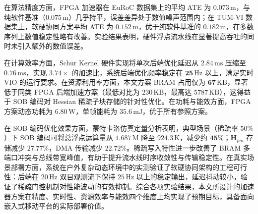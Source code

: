 在算法精度方面，FPGA 加速器在 EuRoC 数据集上的平均 ATE 为 $0.073\,\mathrm{m}$，与纯软件基准（$0.075\,\mathrm{m}$）几乎持平，误差差异处于数值噪声范围内；在 TUM-VI 数据集上，软硬协同方案平均 ATE 为 $0.152\,\mathrm{m}$，优于纯软件基准的 $0.182\,\mathrm{m}$，在多数序列上数值稳定性略有改善。实验结果表明，硬件浮点流水线在显著提高吞吐的同时未引入额外的数值误差。

在计算效率方面，Schur Kernel 硬件实现将单次后端优化延迟从 $2.84\,\mathrm{ms}$ 压缩至 $0.76\,\mathrm{ms}$，实现 $\mathbf{3.74\times}$ 的加速比，系统后端优化频率稳定在 $\mathbf{25\,\mathrm{Hz}}$ 以上，满足实时 VIO 的运行要求。在资源利用率方面，本文方案 BRAM 占用仅为 $\mathbf{67\,\mathrm{KB}}$，显著低于同类 FPGA 后端加速方案（最低对比为 $230\,\mathrm{KB}$，最高达 $5787\,\mathrm{KB}$），这得益于 SOB 编码对 Hessian 稀疏子块存储的针对性优化。在功耗与能效方面，FPGA 方案动态功耗为 $6.80\,\mathrm{W}$，单帧能耗为 $\mathbf{35.6\,\mathrm{mJ}}$，优于所有参照方案。

在 SOB 编码优化效果方面，蒙特卡洛仿真定量分析表明，典型场景（稀疏率 $50\%$）下 SOB 编码可将总浮点运算量从 $1.687\,\mathrm{M}$ 降至 $924.3\,\mathrm{K}$，减少约 $\mathbf{45\%}$；$\mathbf{H}_{pm}$ 存储减少 $27.77\%$，DMA 传输减少 $22.72\%$。稀疏写入特性进一步改善了 BRAM 多端口冲突与总线带宽峰值，有助于提升流水线时序收敛性与传输稳定性。在真实场景部署方面，系统在户外复杂动态环境中的实测验证了软硬协同架构的工程可行性：后端在 $20\,\mathrm{Hz}$ 双目观测流下保持 $25\,\mathrm{Hz}$ 以上的稳定输出，延迟抖动较小，验证了稀疏门控机制对性能波动的有效抑制。综合各项实验结果，本文所设计的加速器方案在精度、实时性、资源效率与能效四个维度上均实现了预期目标，具备面向嵌入式移动平台的实际部署价值。